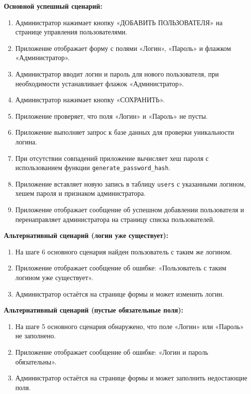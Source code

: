 \textbf{Основной успешный сценарий:}
\begin{enumerate}
	\item Администратор нажимает кнопку «ДОБАВИТЬ ПОЛЬЗОВАТЕЛЯ» на странице управления пользователями.
	\item Приложение отображает форму с полями «Логин», «Пароль» и флажком «Администратор».
	\item Администратор вводит логин и пароль для нового пользователя, при необходимости устанавливает флажок «Администратор».
	\item Администратор нажимает кнопку «СОХРАНИТЬ».
	\item Приложение проверяет, что поля «Логин» и «Пароль» не пусты.
	\item Приложение выполняет запрос к базе данных для проверки уникальности логина.
	\item При отсутствии совпадений приложение вычисляет хеш пароля с использованием функции \texttt{generate\_password\_hash}.
	\item Приложение вставляет новую запись в таблицу \texttt{users} с указанными логином, хешем пароля и признаком администратора.
	\item Приложение отображает сообщение об успешном добавлении пользователя и перенаправляет администратора на страницу списка пользователей.
\end{enumerate}

\textbf{Альтернативный сценарий (логин уже существует):}
\begin{enumerate}
	\item На шаге 6 основного сценария найден пользователь с таким же логином.
	\item Приложение отображает сообщение об ошибке: «Пользователь с таким логином уже существует».
	\item Администратор остаётся на странице формы и может изменить логин.
\end{enumerate}

\textbf{Альтернативный сценарий (пустые обязательные поля):}
\begin{enumerate}
	\item На шаге 5 основного сценария обнаружено, что поле «Логин» или «Пароль» не заполнено.
	\item Приложение отображает сообщение об ошибке: «Логин и пароль обязательны».
	\item Администратор остаётся на странице формы и может заполнить недостающие поля.
\end{enumerate}

